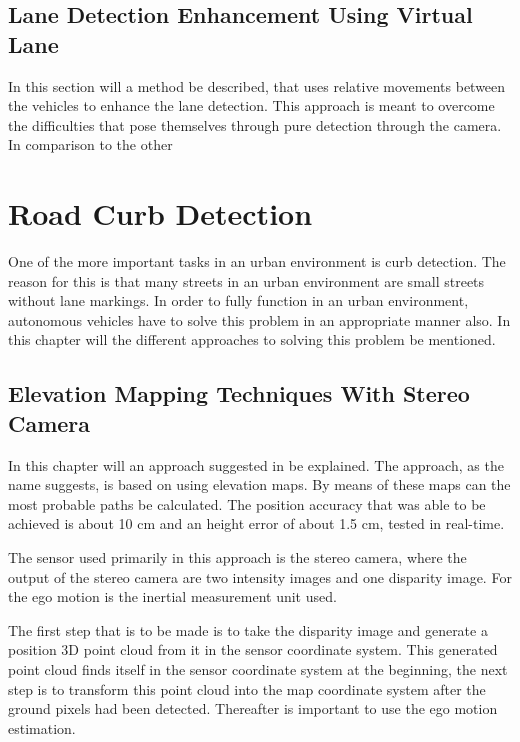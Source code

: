 \documentclass[conference]{IEEEtran}
\begin{document}
\subsection{Lane Detection Enhancement Using Virtual Lane}

In this section will a method be described, that uses relative movements between the vehicles to enhance the lane detection. This approach is meant to overcome the difficulties that pose themselves through pure detection through the camera. In comparison to the other  



\section{Road Curb Detection}

One of the more important tasks in an urban environment is curb detection. The reason for this is that many streets in an urban environment are small streets without lane markings. In order to fully function in an urban environment, autonomous vehicles have to solve this problem in an appropriate manner also. In this chapter will the different approaches to solving this problem be mentioned.  

\subsection{Elevation Mapping Techniques With Stereo Camera}

In this chapter will an approach suggested in \cite{stereo} be explained. The approach, as the name suggests, is based on using elevation maps. By means of these maps can the most probable paths be calculated. The position accuracy that was able to be achieved is about 10 cm and an height error of about 1.5 cm, tested in real-time.

The sensor used primarily in this approach is the stereo camera, where the output of the stereo camera are two intensity images and one disparity image. For the ego motion is the inertial measurement unit used. 

The first step that is to be made is to take the disparity image and generate a position 3D point cloud from it in the sensor coordinate system. This generated point cloud finds itself in the sensor coordinate system at the beginning, the next step is to transform this point cloud into the map coordinate system after the ground pixels had been detected. Thereafter is important to use the ego motion estimation. 
\end{document}
